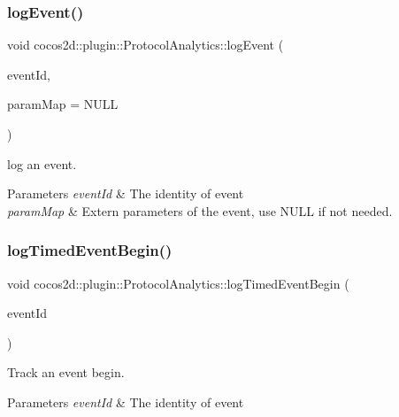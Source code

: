 \subsubsection{\texorpdfstring{log\+Event()}{logEvent()}}
{\footnotesize\ttfamily void cocos2d\+::plugin\+::\+Protocol\+Analytics\+::log\+Event (\begin{DoxyParamCaption}\item[{const char $\ast$}]{event\+Id,  }\item[{Log\+Event\+Param\+Map $\ast$}]{param\+Map = {\ttfamily NULL} }\end{DoxyParamCaption})}



log an event. 


\begin{DoxyParams}{Parameters}
{\em event\+Id} & The identity of event \\
\hline
{\em param\+Map} & Extern parameters of the event, use N\+U\+LL if not needed. \\
\hline
\end{DoxyParams}
\mbox{\label{classcocos2d_1_1plugin_1_1ProtocolAnalytics_ad7677531ddb888fbadcf2fa5211782b8}} 
\subsubsection{\texorpdfstring{log\+Timed\+Event\+Begin()}{logTimedEventBegin()}}
{\footnotesize\ttfamily void cocos2d\+::plugin\+::\+Protocol\+Analytics\+::log\+Timed\+Event\+Begin (\begin{DoxyParamCaption}\item[{const char $\ast$}]{event\+Id }\end{DoxyParamCaption})}



Track an event begin. 


\begin{DoxyParams}{Parameters}
{\em event\+Id} & The identity of event \\
\hline
\end{DoxyParams}
\mbox{\label{classcocos2d_1_1plugin_1_1ProtocolAnalytics_a019f1e89d75c6f4c6cf89c28aad9a098}} 
